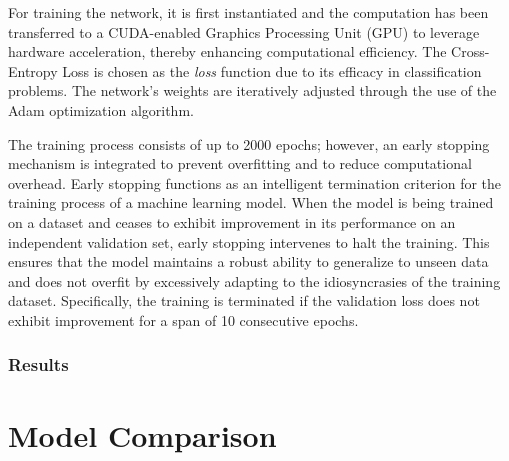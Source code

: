 For training the network, it is first instantiated and the computation has been transferred to a CUDA-enabled Graphics Processing Unit (GPU) to leverage hardware acceleration, thereby enhancing computational efficiency. The Cross-Entropy Loss is chosen as the \textit{loss} function due to its efficacy in classification problems. The network's weights are iteratively adjusted through the use of the Adam optimization algorithm.

The training process consists of up to 2000 epochs; however, an early stopping mechanism is integrated to prevent overfitting and to reduce computational overhead. Early stopping functions as an intelligent termination criterion for the training process of a machine learning model. When the model is being trained on a dataset and ceases to exhibit improvement in its performance on an independent validation set, early stopping intervenes to halt the training. This ensures that the model maintains a robust ability to generalize to unseen data and does not overfit by excessively adapting to the idiosyncrasies of the training dataset. 
Specifically, the training is terminated if the validation loss does not exhibit improvement for a span of 10 consecutive epochs.


\subsubsection{Results}


\section{Model Comparison}



